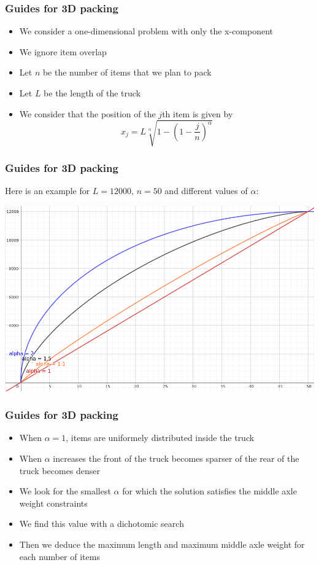 \documentclass[10pt]{beamer}
\begin{document}
\begin{frame}
  \frametitle{Guides for 3D packing}
  
  \begin{itemize}
    \item We consider a one-dimensional problem with only the x-component
    \item We ignore item overlap
    \item Let $n$ be the number of items that we plan to pack
    \item Let $L$ be the length of the truck
    \item We consider that the position of the $j$th item is given by
      \begin{displaymath}
        x_j = L \sqrt[\alpha]{1 - {\left( 1 - \frac{j}{n} \right)}^\alpha}
      \end{displaymath}
  \end{itemize}
\end{frame}
\begin{frame}
  \frametitle{Guides for 3D packing}

  Here is an example for $L = 12000$, $n = 50$ and different values of $\alpha$:
  \begin{center}
    \includegraphics[width=\textwidth]{img/3d_packing_guides.png}
  \end{center}

\end{frame}
\begin{frame}
  \frametitle{Guides for 3D packing}

  \begin{itemize}
    \item When $\alpha = 1$, items are uniformely distributed inside the truck
    \item When $\alpha$ increases the front of the truck becomes sparser of the rear of the truck becomes denser
    \item We look for the smallest $\alpha$ for which the solution satisfies the middle axle weight constraints
    \item We find this value with a dichotomic search
    \item Then we deduce the maximum length and maximum middle axle weight for each number of items
  \end{itemize}

\end{frame}
\end{document}
